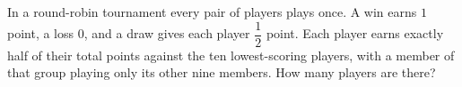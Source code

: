 In a round-robin tournament every pair of players plays once. A win earns $1$ point, a loss $0$, and a draw gives each player $\dfrac{1}{2}$ point. Each player earns exactly half of their total points against the ten lowest-scoring players, with a member of that group playing only its other nine members. How many players are there?
